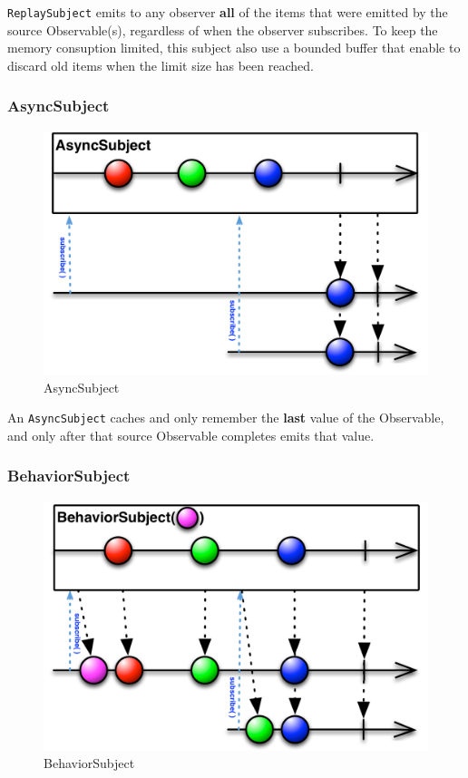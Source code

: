 \texttt{ReplaySubject} emits to any observer \textbf{all} of the items
that were emitted by the source Observable(s), regardless of when the
observer subscribes. To keep the memory consuption limited, this subject
also use a bounded buffer that enable to discard old items when the
limit size has been reached.

\subsubsection{AsyncSubject}\label{asyncsubject}

\begin{figure}[htbp]
\centering
\includegraphics[scale=0.5]{imgs/asyncsubj.png}
\caption{AsyncSubject}
\end{figure}

An \texttt{AsyncSubject} caches and only remember the \textbf{last}
value of the Observable, and only after that source Observable completes
emits that value.

\subsubsection{BehaviorSubject}\label{behaviorsubject}

\begin{figure}[htbp]
\centering
\includegraphics[scale=0.5]{imgs/behasubj.png}
\caption{BehaviorSubject}
\end{figure}

